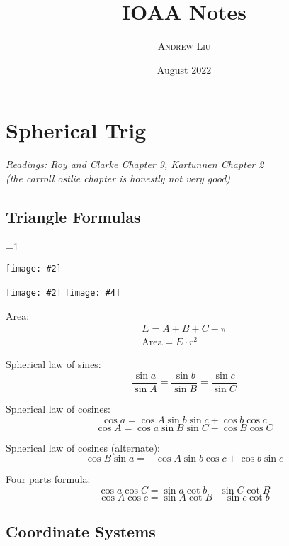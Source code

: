 \documentclass[11pt]{article}
\title{\huge {\fontfamily{lmss}\selectfont
\textbf{IOAA Notes}}}
\author{\scshape \Large Andrew Liu}
\date{{\fontfamily{cmr}\selectfont August 2022}}
\newcommand{\image}[5][1]{
\ifnum #1=1 
    \begin{center}
        \texttt{[image: \#2]}
    \end{center}
\else
    \begin{center}
        \texttt{[image: \#2]}
        \texttt{[image: \#4]}
    \end{center}
\fi
}
\begin{document}
\maketitle

\section{Spherical Trig}

\textit{Readings: Roy and Clarke Chapter 9, Kartunnen Chapter 2 \\(the carroll ostlie chapter is honestly not very good)}

\subsection{Triangle Formulas}

\image{images/triangle.png}{9}{}{}

Area:
\begin{align*}
    E = A + B + C - \pi \\
    \text{Area} = E\cdot r^2
\end{align*}

Spherical law of sines: 
\begin{equation*}
    \frac{\sin{a}}{\sin{A}} = \frac{\sin{b}}{\sin{B}} =\frac{\sin{c}}{\sin{C}}
\end{equation*}

Spherical law of cosines: 
\begin{equation*}
    \cos{a} = \cos{A}\sin{b}\sin{c}+\cos{b}\cos{c}
\end{equation*}
\begin{equation*}
    \cos{A} = \cos{a}\sin{B}\sin{C}-\cos{B}\cos{C}
\end{equation*}

Spherical law of cosines (alternate): 
\begin{equation*}
    \cos{B}\sin{a} = -\cos{A}\sin{b}\cos{c}+\cos{b}\sin{c}
\end{equation*}

Four parts formula: 
\begin{equation*}
    \cos{a}\cos{C} = \sin{a}\cot{b} - \sin{C}\cot{B}
\end{equation*}
\begin{equation*}
    \cos{A}\cos{c} = \sin{A}\cot{B} - \sin{c}\cot{b}
\end{equation*}

\subsection{Coordinate Systems}
\end{document}
